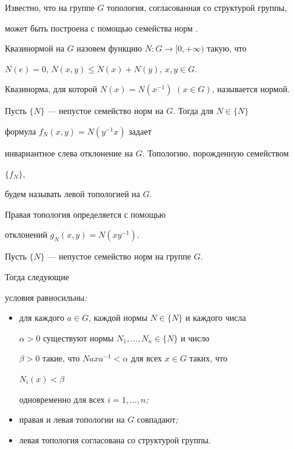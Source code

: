  


Известно, что на группе $G$ топология, согласованная со структурой группы, 


может быть построена с помощью семейства норм \cite{Mar}. 


 


Квазинормой на $G$ назовем функцию $N:G\to[0,+\infty)$ такую, что 


$N(e)=0$, $N(x,y)\le N(x)+N(y)$, $x,y\in G$. 


Квазинорма, для которой $N(x)=N(x^{-1})$ $(x\in G)$, называется нормой. 


 


Пусть $\{N\}$ --- непустое семейство норм на $G$. Тогда для $N\in\{N\}$ 


формула $f_N(x,y)=N(y^{-1}x)$ задает 


инвариантное слева отклонение на $G$. Топологию, порожденную семейством 


$\{f_N\}$, 


будем называть левой топологией на $G$. 


Правая топология определяется с помощью 


отклонений $g_N(x,y)=N(xy^{-1})$. 


 


\begin{thm} Пусть $\{N\}$ --- непустое семейство норм на группе $G$. 


Тогда следующие 


условия равносильны{\em :}


\begin{itemize} 


\item[Г)] для каждого $a\in G$, каждой нормы $N\in\{N\}$ и каждого числа 


$\alpha>0$ существуют нормы $N_1,\dotsc,N_n\in\{N\}$ и число 


$\beta>0$ такие, что $Naxa^{-1}<\alpha$ для всех $x\in G$ таких, что 


$N_i(x)<\beta$ 


одновременно для всех $i=1,\dotsc,n${\em ;}


\item[Д)] правая и левая топологии на $G$ совпадают{\em ;}


\item[Е)] левая топология согласована со структурой группы. 


\end{itemize} 


\end{thm} 



